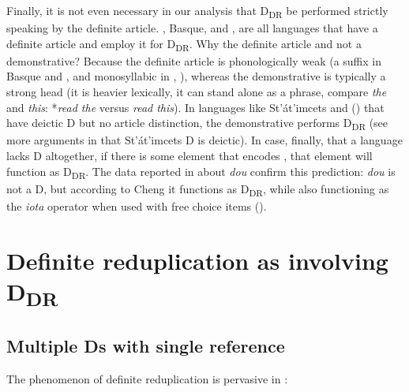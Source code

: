 \documentclass[output=paper,
modfonts
]{langscibook}
\begin{document}
Finally, it is not even necessary in our analysis that D\textsubscript{DR} be performed strictly speaking by the definite article. , Basque,  and , are all languages that have a definite article and employ it for D\textsubscript{DR}. Why the definite article and not a demonstrative? Because the definite article is phonologically weak (a suffix in Basque and , and monosyllabic in , ), whereas the demonstrative is typically a strong head (it is heavier lexically, it can stand alone as a phrase, compare \textit{the} and \textit{this}: *\textit{read the} versus \textit{read this}). In languages like St'\'at'imcets and  (\citealt{kang2015}) that have deictic D but no article distinction, the demonstrative performs D\textsubscript{DR} (see more arguments in \citealt{etxeberria-giannakidou2014} that St'\'at'imcets D is deictic). In case, finally, that a language lacks D altogether, if there is some element that encodes , that element will function as D\textsubscript{DR}. The data reported in \citet{Cheng2009} about  \textit{dou} confirm this prediction: \textit{dou} is not a D, but according to Cheng it functions as D\textsubscript{DR}, while also functioning as the \textit{iota} operator when used with free choice items (\citealt{giannakidou-cheng2006}).


\section{Definite reduplication as involving D\textsubscript{DR}} \label{sec:etxeberria:4}

\subsection{Multiple Ds with single reference}

The phenomenon of definite reduplication is pervasive in  \citep{AlexiadouWilder1998b, CamposStravrou2004, kolliakou2004, ioannidou-dendikken2006, lekakou-szendroi2007}:

\ea\label{ex:etxeberria:42}  \\
\z
\z
\end{document}
